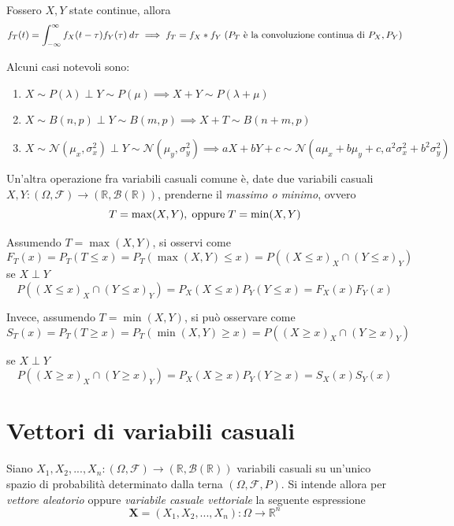             Fossero $X, Y$ state continue, allora
            \[
                f_{T}(t) = \int_{-\infty}^{\infty} f_{X}(t - \tau)f_{Y}(\tau) \: d\tau \implies f_{T} = f_{X} * f_{Y} \; (P_{T} \textnormal{ è la convoluzione continua di } P_{X}, P_{Y})
            \]

            Alcuni casi notevoli sono:
            \begin{enumerate}
                \item $X \sim P(\lambda) \perp Y \sim P(\mu) \implies X + Y \sim P(\lambda + \mu)$
                \item $X \sim B(n, p) \perp Y \sim B(m, p) \implies X + T \sim B(n + m, p)$
                \item $X \sim \mathcal{N}(\mu_{x}, \sigma_{x}^{2}) \perp Y \sim \mathcal{N}(\mu_{y}, \sigma_{y}^{2}) \implies aX + bY + c \sim \mathcal{N}(a\mu_{x} + b\mu_{y} + c, a^{2} \sigma_{x}^{2} + b^{2} \sigma_{y}^{2})$
            \end{enumerate}


            Un'altra operazione fra variabili casuali comune è, date due variabili casuali $X, Y: (\Omega, \mathcal{F}) \rightarrow (\mathbb{R}, \mathcal{B}(\mathbb{R}))$, prenderne il \textit{massimo o minimo}, ovvero
            \[
                T = \max(X, Y), \; \textnormal{oppure} \; T = \min(X, Y)
            \]

            Assumendo $T = \max(X, Y)$, si osservi come
            \[
                F_{T}(x) = P_{T}(T \leq x) = P_{T}(\max(X, Y) \leq x) = P((X \leq x)_{X} \cap (Y \leq x)_{Y})
            \]
            se $X \perp Y$
            \[
                P((X \leq x)_{X} \cap (Y \leq x)_{Y}) = P_{X}(X \leq x)P_{Y}(Y \leq x) = F_{X}(x)F_{Y}(x)
            \]

            Invece, assumendo $T = \min(X, Y)$, si può osservare come
            \[
                S_{T}(x) = P_{T}(T \geq x) = P_{T}(\min(X, Y) \geq x) = P((X \geq x)_{X} \cap (Y \geq x)_{Y})
            \]

            se $X \perp Y$
            \[
                P((X \geq x)_{X} \cap (Y \geq x)_{Y}) = P_{X}(X \geq x) P_{Y}(Y \geq x) = S_{X}(x)S_{Y}(x)
            \]



    \section{Vettori di variabili casuali}
        Siano $X_{1}, X_{2}, ..., X_{n}: (\Omega, \mathcal{F}) \rightarrow (\mathbb{R}, \mathcal{B}(\mathbb{R}))$ variabili casuali su un'unico spazio di probabilità determinato dalla terna $(\Omega, \mathcal{F}, P)$.
        Si intende allora per \textit{vettore aleatorio} oppure \textit{variabile casuale vettoriale} la seguente espressione
        \[
            \mathbf{X} = (X_{1}, X_{2}, ..., X_{n}): \Omega \rightarrow \mathbb{R}^{n}
        \]

